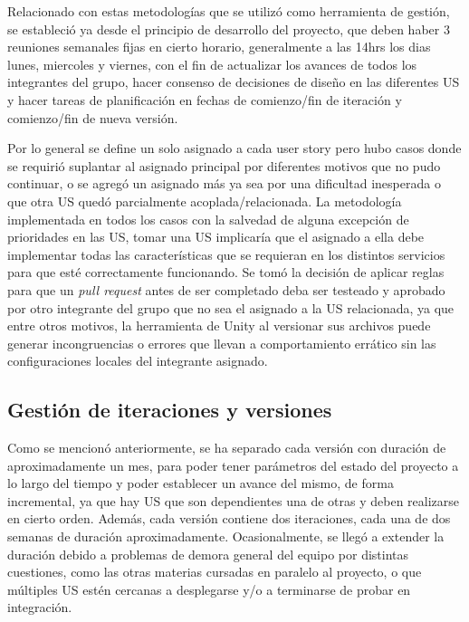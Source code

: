 Relacionado con estas metodologías que se utilizó como herramienta de gestión, se estableció ya desde el principio de desarrollo del proyecto, 
que deben haber 3 reuniones semanales fijas en cierto horario, generalmente a las 14hrs los dias lunes, miercoles y viernes, 
con el fin de actualizar los avances de todos los integrantes del grupo, hacer consenso de decisiones de diseño en las 
diferentes US y hacer tareas de planificación en fechas de comienzo/fin de iteración y 
comienzo/fin de nueva versión.
\vspace{0.25cm}

Por lo general se define un solo asignado a cada user story pero hubo casos donde se requirió suplantar al asignado 
principal por diferentes motivos que no pudo continuar, o se agregó un asignado más ya sea por una dificultad inesperada 
o que otra US quedó parcialmente acoplada/relacionada. La metodología implementada en todos los casos con la 
salvedad de alguna excepción de prioridades en las US, tomar una US implicaría que el asignado a ella debe implementar 
todas las características que se requieran en los distintos servicios para que esté correctamente funcionando. Se tomó
la decisión de aplicar reglas para que un \textit{pull request} antes de ser completado deba ser testeado y aprobado 
por otro integrante del grupo que no sea el asignado a la US relacionada, ya que entre otros motivos, la herramienta de Unity al 
versionar sus archivos puede generar incongruencias o errores que llevan a comportamiento errático sin las 
configuraciones locales del integrante asignado.
\vspace{0.25cm}

\subsection{Gestión de iteraciones y versiones}

Como se mencionó anteriormente, se ha separado cada versión con duración de aproximadamente un mes, para poder tener 
parámetros del estado del proyecto a lo largo del tiempo y poder establecer un avance del mismo, de forma incremental, 
ya que hay US que son dependientes una de otras y deben realizarse en cierto orden. Además, cada versión contiene 
dos iteraciones, cada una de dos semanas de duración aproximadamente. Ocasionalmente, se llegó a extender la duración debido a 
problemas de demora general del equipo por distintas cuestiones, como las otras materias cursadas en paralelo al proyecto, o 
que múltiples US estén cercanas a desplegarse y/o a terminarse de probar en integración.
\vspace{0.25cm}

